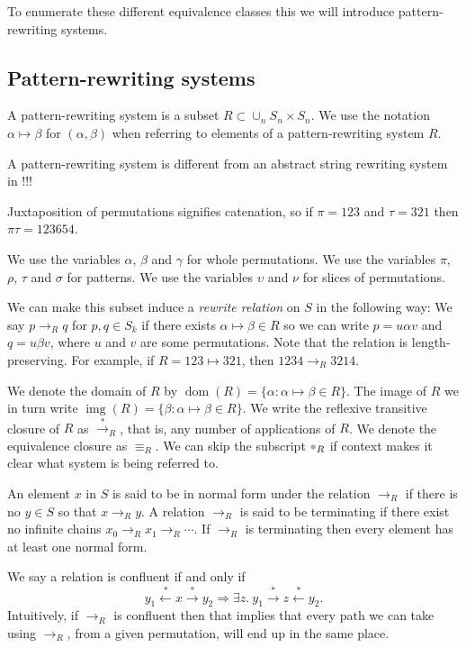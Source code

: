 \documentclass[a4paper, 11pt]{article}
\newcommand{\parm}{\mathord{\color{black!33}\bullet}}
\theoremstyle{definition}
\newcommand{\Sym}{S}
\newcommand{\from}{\leftarrow}
\newcommand{\tostar}{\stackrel{*}{\to}}
\newcommand{\fromstar}{\stackrel{*}{\from}}
\DeclareMathOperator{\dom}{dom}
\DeclareMathOperator{\img}{img}
\begin{document}
To enumerate these different equivalence classes this we will introduce
pattern-rewriting systems.

\subsection{Pattern-rewriting systems}
A pattern-rewriting system is a subset $R \subset \cup_n \Sym_n \times \Sym_n$.
We use the notation $\alpha \mapsto \beta$ for $(\alpha, \beta)$ when referring
to elements of a pattern-rewriting system $R$. 

A pattern-rewriting system is different from an abstract string rewriting system
in !!!

Juxtaposition of permutations signifies catenation, so if $\pi=123$ and
$\tau=321$ then $\pi\tau=123654$.

We use the variables $\alpha$, $\beta$ and $\gamma$ for whole permutations.
We use the variables $\pi$, $\rho$, $\tau$ and $\sigma$ for patterns.
We use the variables $\upsilon$ and $\nu$ for slices of permutations.


We can make this subset induce a \emph{rewrite relation} on $\Sym$ in the following way: We say
$p \to_R q$ for $p, q \in \Sym_k$ if there exists $\alpha \mapsto \beta \in R$ so
we can write $p = u \alpha v$ and $q = u \beta v$, where
$u$ and $v$ are some permutations.  Note that the relation is
length-preserving. For example, if $R = {123 \mapsto 321}$, then $1234 \to_R 3214$. 

We denote the domain of $R$ by $\dom(R) = \{\alpha : \alpha \mapsto \beta \in
R\}$. The image of $R$ we in turn write $\img(R) = \{\beta : \alpha \mapsto \beta \in
R\}$. We write the reflexive transitive closure of $R$ as $\tostar_R$, that is,
any number of applications of $R$. We denote the equivalence closure as
$\equiv_R$. We can skip the subscript $\parm_R$ if context makes it clear what
system is being referred to.

An element $x$ in $\Sym$ is said to be in normal form under the relation $\to_R$
if there is no $y \in \Sym$ so that $x \to_R y$. A relation $\to_R$ is said to be
terminating if there exist no infinite chains $x_0 \to_R x_1 \to_R \cdots$. If
$\to_R$ is terminating then every element has at least one normal form. 

We say a relation is confluent if and only if
$$
    y_1 \fromstar x \tostar y_2 \Longrightarrow 
    \exists z. \  y_1 \tostar z \fromstar y_2.
$$
Intuitively, if $\to_R$ is confluent then that implies that every path we can
take using $\to_R$, from a given permutation, will end up in the same place. 
\end{document}
